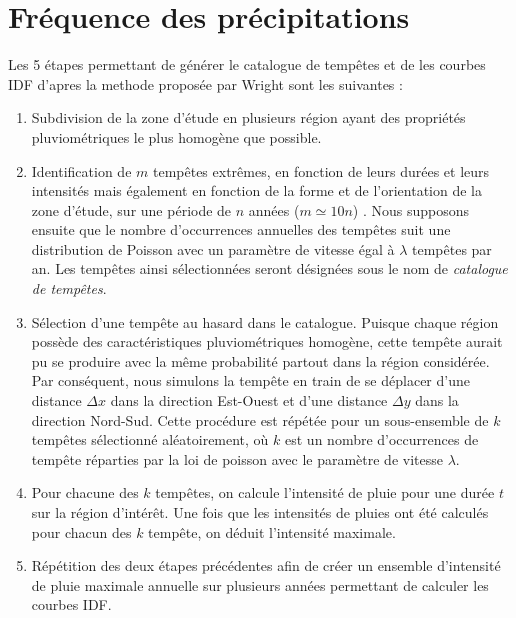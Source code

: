 \section{Fréquence des précipitations}
Les 5 étapes permettant de g\'en\'erer le catalogue de temp\^etes et de les courbes IDF d'apres la methode propos\'ee par Wright \cite{wright_estimating_2013} sont les suivantes  :
\begin{enumerate}
\item Subdivision de la zone d'étude en plusieurs région ayant des propriétés pluviométriques le plus  homogène que possible. 


\item Identification de $m$   tempêtes extrêmes, en fonction de leurs durées et leurs intensités  mais également en fonction  de la forme et de l'orientation de la zone d'étude, sur une période de $n$ années ($m\simeq 10n$) . Nous supposons ensuite que le nombre d'occurrences annuelles des tempêtes suit une distribution de Poisson avec un paramètre de vitesse égal à $\lambda$ tempêtes par an. Les tempêtes ainsi sélectionnées seront désignées sous le nom de \emph{catalogue de tempêtes}.
\item Sélection d'une tempête au hasard dans le catalogue. Puisque chaque région possède des caractéristiques pluviométriques homogène, cette tempête aurait pu se produire avec la même probabilité partout dans la région considérée. Par conséquent, nous simulons la tempête en train de se déplacer d'une distance $\Delta x$ dans la direction Est-Ouest  et d'une distance $\Delta y$ dans la direction Nord-Sud.
 Cette procédure est répétée pour un sous-ensemble de $k$ tempêtes sélectionné aléatoirement, o\`u $k$ est un nombre d'occurrences de tempête réparties par la loi de poisson avec le paramètre de vitesse $\lambda$.
\item Pour chacune des $k$ temp\^etes, on calcule l'intensité de pluie pour une durée $t$ sur la région d'intér\^et. Une fois que les intensités de pluies  ont été calculés pour chacun des $k$ tempête, on déduit l'intensité maximale.
\item Répétition des deux étapes précédentes afin de créer un ensemble d'intensité de pluie maximale annuelle sur plusieurs années permettant de calculer les courbes IDF.
\end{enumerate}